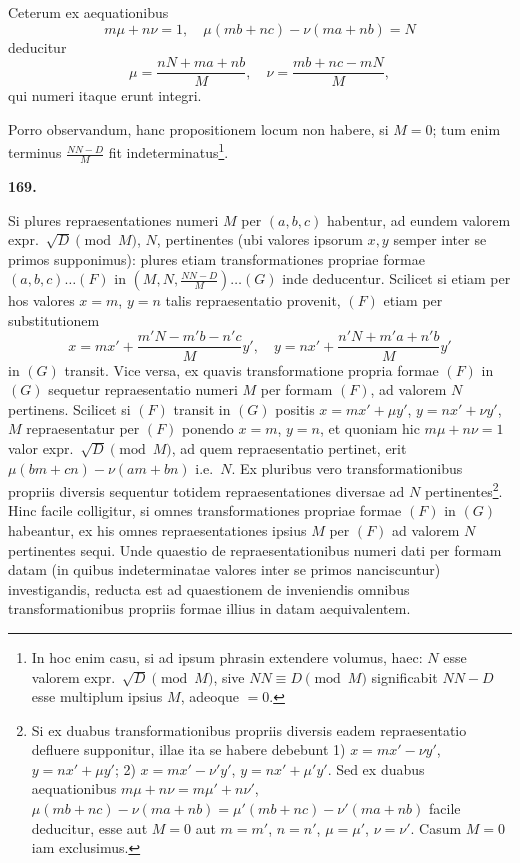 \documentclass[12pt,a4paper]{article}
\theoremstyle{plain}
\begin{document}
Ceterum ex aequationibus
\[
m\mu + n\nu = 1, \quad \mu(mb+nc) - \nu(ma+nb) = N
\]
deducitur
\[
\mu = \frac{nN + ma + nb}{M}, \quad \nu = \frac{mb + nc - mN}{M},
\]
qui numeri itaque erunt integri.

Porro observandum, hanc propositionem locum non habere, si $M = 0$; tum enim terminus $\frac{NN-D}{M}$ fit indeterminatus\footnote{In hoc enim casu, si ad ipsum phrasin extendere volumus, haec: $N$ esse valorem expr.~$\sqrt{D} \pmod{M}$, sive $NN \equiv D \pmod{M}$ significabit $NN-D$ esse multiplum ipsius $M$, adeoque $= 0$.}.

\bigskip

\textbf{169.}

Si plures repraesentationes numeri $M$ per $(a,b,c)$ habentur, ad eundem valorem expr.~$\sqrt{D} \pmod{M}$, $N$, pertinentes (ubi valores ipsorum $x,y$ semper inter se primos supponimus): plures etiam transformationes propriae formae $(a,b,c)\ldots(F)$ in $(M,N,\frac{NN-D}{M})\ldots(G)$ inde deducentur. Scilicet si etiam per hos valores $x = m$, $y = n$ talis repraesentatio provenit, $(F)$ etiam per substitutionem
\[
x = mx' + \frac{m'N - m'b - n'c}{M}y', \quad y = nx' + \frac{n'N + m'a + n'b}{M}y'
\]
in $(G)$ transit. Vice versa, ex quavis transformatione propria formae $(F)$ in $(G)$ sequetur repraesentatio numeri $M$ per formam $(F)$, ad valorem $N$ pertinens. Scilicet si $(F)$ transit in $(G)$ positis $x = mx' + \mu y'$, $y = nx' + \nu y'$, $M$ repraesentatur per $(F)$ ponendo $x = m$, $y = n$, et quoniam hic $m\mu + n\nu = 1$ valor expr.~$\sqrt{D} \pmod{M}$, ad quem repraesentatio pertinet, erit $\mu(bm+cn) - \nu(am+bn)$ i.e.~$N$. Ex pluribus vero transformationibus propriis diversis sequentur totidem repraesentationes diversae ad $N$ pertinentes\footnote{Si ex duabus transformationibus propriis diversis eadem repraesentatio defluere supponitur, illae ita se habere debebunt 1) $x = mx' - \nu y'$, $y = nx' + \mu y'$; 2) $x = mx' - \nu' y'$, $y = nx' + \mu' y'$. Sed ex duabus aequationibus $m\mu + n\nu = m\mu' + n\nu'$, $\mu(mb+nc) - \nu(ma+nb) = \mu'(mb+nc) - \nu'(ma+nb)$ facile deducitur, esse aut $M = 0$ aut $m = m'$, $n = n'$, $\mu = \mu'$, $\nu = \nu'$. Casum $M = 0$ iam exclusimus.}. Hinc facile colligitur, si omnes transformationes propriae formae $(F)$ in $(G)$ habeantur, ex his omnes repraesentationes ipsius $M$ per $(F)$ ad valorem $N$ pertinentes sequi. Unde quaestio de repraesentationibus numeri dati per formam datam (in quibus indeterminatae valores inter se primos nanciscuntur) investigandis, reducta est ad quaestionem de inveniendis omnibus transformationibus propriis formae illius in datam aequivalentem.
\end{document}
